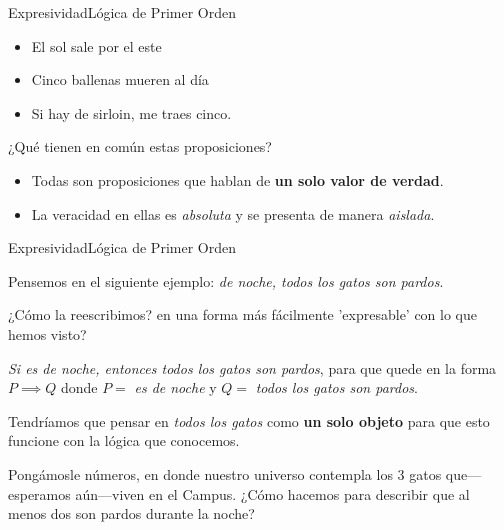 \documentclass[spanish, c]{beamer}
\begin{document}
\begin{frame}{Expresividad}{Lógica de Primer Orden}
    \begin{itemize}
        \item El sol sale por el este
        \item Cinco ballenas mueren al día
        \item Si hay de sirloin, me traes cinco.
    \end{itemize} \pause

    \begin{center}
        ¿Qué tienen en común estas proposiciones?
    \end{center} \pause

    \begin{itemize}
        \item Todas son proposiciones que hablan de \textbf{un solo valor de verdad}.
        \item La veracidad en ellas es \textit{absoluta} y se presenta de manera \textit{aislada}.
    \end{itemize}

\end{frame}

\begin{frame}{Expresividad}{Lógica de Primer Orden}

    Pensemos en el siguiente ejemplo: \textit{de noche, todos los gatos son pardos}.
    
    ¿Cómo la reescribimos? en una forma más fácilmente 'expresable' con lo que hemos visto? \pause

    \bigskip

    \textit{Si es de noche, entonces todos los gatos son pardos}, para que quede en la forma $ P \implies Q$
    donde $P =$ \textit{es de noche} y $Q = $ \textit{todos los gatos son pardos}. \pause

    \bigskip

    Tendríamos que pensar en \textit{todos los gatos} como \textbf{un solo objeto} para que esto funcione con la lógica que conocemos. \pause

    \bigskip

    Pongámosle números, en donde nuestro universo contempla los 3 gatos que---esperamos aún---viven en el Campus.
    ¿Cómo hacemos para describir que al menos dos son pardos durante la noche?

\end{frame}
\end{document}
